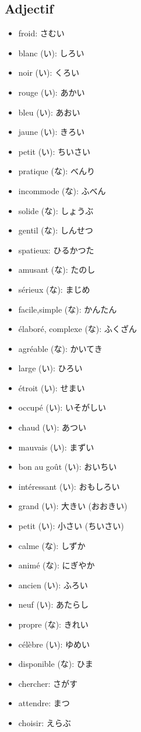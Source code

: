 \documentclass{article}
\begin{document}
\begin{CJK}{UTF8}{min}
    \subsection{Adjectif}
    \begin{itemize}
        \item froid: さむい
        \item blanc (い): しろい
        \item noir (い): くろい
        \item rouge (い): あかい
        \item bleu (い): あおい
        \item jaune (い): きろい
        \item petit (い): ちいさい
        \item pratique (な): べんり
        \item incommode (な): ふべん
        \item solide (な): しょうぶ
        \item gentil (な): しんせつ
        \item spatieux: ひるかつた
        \item amusant (な): たのし
        \item sérieux (な): まじめ
        \item facile,simple (な): かんたん
        \item élaboré, complexe (な): ふくざん
        \item agréable (な): かいてき
        \item large (い): ひろい
        \item étroit (い): せまい
        \item occupé (い): いそがしい
        \item chaud (い): あつい
        \item mauvais (い): まずい
        \item bon au goût (い): おいちい
        \item intéressant (い): おもしろい
        \item grand (い): 大きい (おおきい)
        \item petit (い): 小さい (ちいさい)
        \item calme (な): しずか
        \item animé (な): にぎやか
        \item ancien (い): ふろい
        \item neuf (い): あたらし
        \item propre (な): きれい
        \item célèbre (い): ゆめい
        \item disponible (な): ひま
        \item chercher: さがす
        \item attendre: まつ
        \item choisir: えらぶ
    \end{itemize}

\end{CJK}
\end{document}
